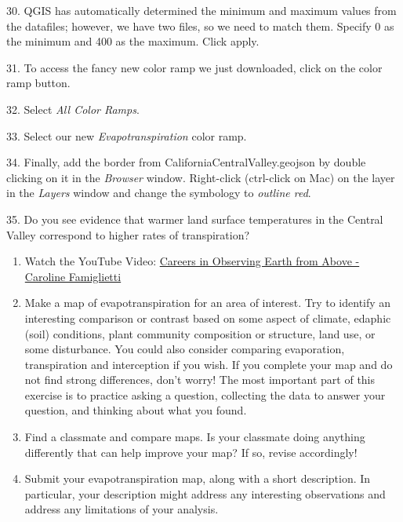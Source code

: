 \documentclass[oneside,a4paper,11pt,explicit]{book}
\begin{document}
30. QGIS has automatically determined the minimum and maximum values from the datafiles; however, we have two files, so we need to match them. Specify 0 as the minimum and 400 as the maximum. Click apply.

31. To access the fancy new color ramp we just downloaded, click on the color ramp button.

32. Select \textit{All Color Ramps}.

33. Select our new \textit{Evapotranspiration} color ramp. 

34. Finally, add the border from CaliforniaCentralValley.geojson by double clicking on it in the \textit{Browser} window. Right-click (ctrl-click on Mac) on the layer in the \textit{Layers} window and change the symbology to \textit{outline red}. 

35. Do you see evidence that warmer land surface temperatures in the Central Valley correspond to higher rates of transpiration?


\begin{tcolorbox}[colback=yellow!5!white,colframe=MACred,title= \vspace{.2em} \Large Make a Map Assignments]
	\large
	\begin{enumerate}
\item Watch the YouTube Video: \href{https://www.youtube.com/watch?v=Fp30fR4dEm0}{Careers in Observing Earth from Above - Caroline Famiglietti}

\item Make a map of evapotranspiration for an area of interest. Try to identify an interesting comparison or contrast based on some aspect of climate, edaphic (soil) conditions, plant community composition or structure, land use, or some disturbance. You could also consider comparing evaporation, transpiration and interception if you wish. If you complete your map and do not find strong differences, don’t worry! The most important part of this exercise is to practice asking a question, collecting the data to answer your question, and thinking about what you found.

\item Find a classmate and compare maps. Is your classmate doing anything differently that can help improve your map? If so, revise accordingly!

\item Submit your evapotranspiration map, along with a short description. In particular, your description might address any interesting observations and address any limitations of your analysis.

	\end{enumerate}
\end{tcolorbox}
\end{document}
